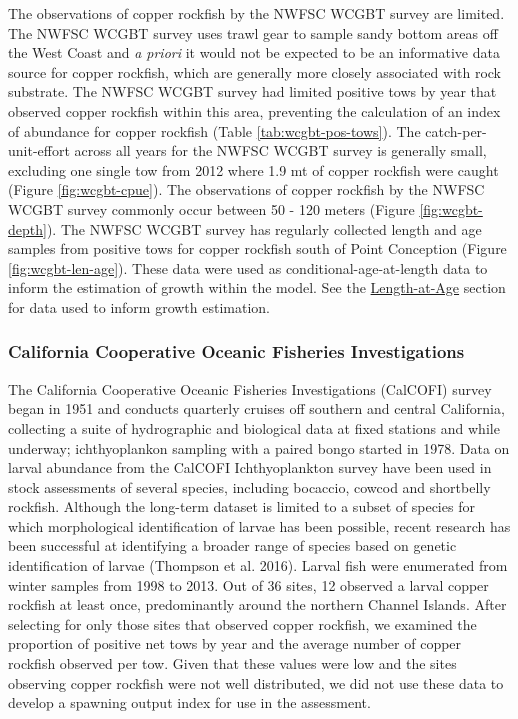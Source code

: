 \documentclass[11pt,
  english,
  letterpaper,
]{article}
\begin{document}
The observations of copper rockfish by the NWFSC WCGBT survey are limited. The NWFSC WCGBT survey uses trawl gear to sample sandy bottom areas off the West Coast and \emph{a priori} it would not be expected to be an informative data source for copper rockfish, which are generally more closely associated with rock substrate. The NWFSC WCGBT survey had limited positive tows by year that observed copper rockfish within this area, preventing the calculation of an index of abundance for copper rockfish (Table \ref{tab:wcgbt-pos-tows}). The catch-per-unit-effort across all years for the NWFSC WCGBT survey is generally small, excluding one single tow from 2012 where 1.9 mt of copper rockfish were caught (Figure \ref{fig:wcgbt-cpue}). The observations of copper rockfish by the NWFSC WCGBT survey commonly occur between 50 - 120 meters (Figure \ref{fig:wcgbt-depth}). The NWFSC WCGBT survey has regularly collected length and age samples from positive tows for copper rockfish south of Point Conception (Figure \ref{fig:wcgbt-len-age}). These data were used as conditional-age-at-length data to inform the estimation of growth within the model. See the \protect\hyperlink{length-at-age}{Length-at-Age} section for data used to inform growth estimation.

\hypertarget{california-cooperative-oceanic-fisheries-investigations}{%
\subsubsection{California Cooperative Oceanic Fisheries Investigations}\label{california-cooperative-oceanic-fisheries-investigations}}

The California Cooperative Oceanic Fisheries Investigations (CalCOFI) survey began in 1951 and conducts quarterly cruises off southern and central California, collecting a suite of hydrographic and biological data at fixed stations and while underway; ichthyoplankon sampling with a paired bongo started in 1978. Data on larval abundance from the CalCOFI Ichthyoplankton survey have been used in stock assessments of several species, including bocaccio, cowcod and shortbelly rockfish. Although the long-term dataset is limited to a subset of species for which morphological identification of larvae has been possible, recent research has been successful at identifying a broader range of species based on genetic identification of larvae (Thompson et al. 2016). Larval fish were enumerated from winter samples from 1998 to 2013. Out of 36 sites, 12 observed a larval copper rockfish at least once, predominantly around the northern Channel Islands. After selecting for only those sites that observed copper rockfish, we examined the proportion of positive net tows by year and the average number of copper rockfish observed per tow. Given that these values were low and the sites observing copper rockfish were not well distributed, we did not use these data to develop a spawning output index for use in the assessment.
\end{document}
